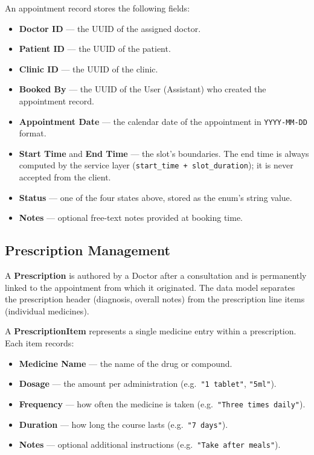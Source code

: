 An appointment record stores the following fields:

\begin{itemize}
  \item \textbf{Doctor ID} --- the UUID of the assigned doctor.
  \item \textbf{Patient ID} --- the UUID of the patient.
  \item \textbf{Clinic ID} --- the UUID of the clinic.
  \item \textbf{Booked By} --- the UUID of the User (Assistant) who
    created the appointment record.
  \item \textbf{Appointment Date} --- the calendar date of the
    appointment in \texttt{YYYY-MM-DD} format.
  \item \textbf{Start Time} and \textbf{End Time} --- the slot's
    boundaries. The end time is always computed by the service layer
    (\texttt{start\_time + slot\_duration}); it is never accepted from
    the client.
  \item \textbf{Status} --- one of the four states above, stored as
    the enum's string value.
  \item \textbf{Notes} --- optional free-text notes provided at booking
    time.
\end{itemize}

\subsection{Prescription Management}
\label{sec:domain-prescriptions}

A \textbf{Prescription} is authored by a Doctor after a consultation
and is permanently linked to the appointment from which it originated.
The data model separates the prescription header (diagnosis, overall
notes) from the prescription line items (individual medicines).

A \textbf{PrescriptionItem} represents a single medicine entry within a
prescription. Each item records:

\begin{itemize}
  \item \textbf{Medicine Name} --- the name of the drug or compound.
  \item \textbf{Dosage} --- the amount per administration (e.g.\
    \texttt{"1 tablet"}, \texttt{"5ml"}).
  \item \textbf{Frequency} --- how often the medicine is taken (e.g.\
    \texttt{"Three times daily"}).
  \item \textbf{Duration} --- how long the course lasts (e.g.\
    \texttt{"7 days"}).
  \item \textbf{Notes} --- optional additional instructions (e.g.\
    \texttt{"Take after meals"}).
\end{itemize}

